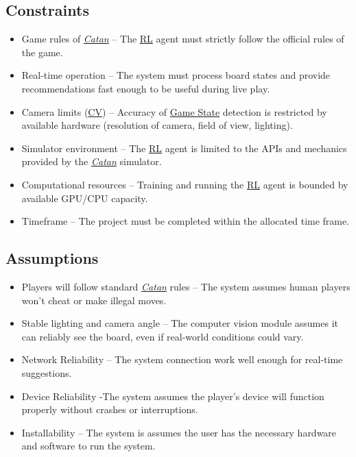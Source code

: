 \documentclass{article}
\newcommand{\Catan}{\href{https://en.wikipedia.org/wiki/Catan}{Catan}}
\newcommand{\RL}{\href{https://www.ibm.com/think/topics/reinforcement-learning}{RL}}
\newcommand{\CV}{\href{https://www.ibm.com/think/topics/computer-vision}{CV}}
\newcommand{\GameState}{\href{https://milvus.io/ai-quick-reference/what-is-a-state-in-rl}{Game State}}
\begin{document}
\subsection{Constraints}\label{subsec:constraints}
\begin{itemize}
    \item {Game rules of \emph{\Catan{}}} – The \RL{} agent must strictly follow the official rules of the game.
    \item {Real-time operation} – The system must process board states and provide recommendations fast enough to be useful during live play.
    \item {Camera limits (\CV{})} – Accuracy of \GameState{} detection is restricted by available hardware (resolution of camera, field of view, lighting).
    \item {Simulator environment} – The \RL{} agent is limited to the APIs and mechanics provided by the \emph{\Catan{}} simulator.
    \item {Computational resources} – Training and running the \RL{} agent is bounded by available GPU/CPU capacity.
    \item {Timeframe} – The project must be completed within the allocated time frame.
\end{itemize}

\subsection{Assumptions}\label{subsec:assumptions}
\begin{itemize}
    \item {Players will follow standard \emph{\Catan{}} rules} – The system assumes human players won’t cheat or make illegal moves.
    \item {Stable lighting and camera angle} – The computer vision module assumes it can reliably see the board, even if real-world conditions could vary.
    \item {Network Reliability} – The system connection work well enough for real-time suggestions.
    \item {Device Reliability} -The system assumes the player’s device will function properly without crashes or interruptions.
    \item {Installability} – The system is assumes the user has the necessary hardware and software to run the system.
\end{itemize}
\end{document}
